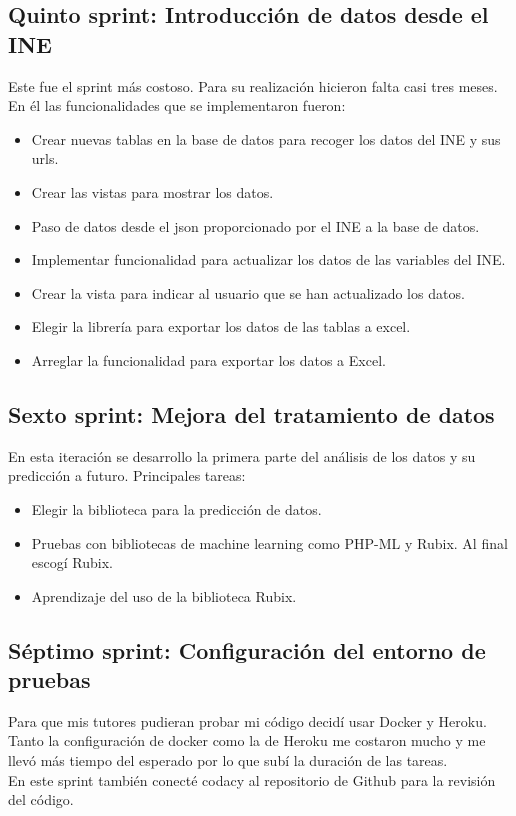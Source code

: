 \subsection{Quinto sprint: Introducción de datos desde el INE}
Este fue el sprint más costoso. Para su realización hicieron falta casi tres meses. En él las funcionalidades que se implementaron fueron:
\begin{itemize}
    \item Crear nuevas tablas en la base de datos para recoger los datos del INE y sus urls.
    \item Crear las vistas para mostrar los datos.
    \item Paso de datos desde el json proporcionado por el INE a la base de datos.
    \item Implementar funcionalidad para actualizar los datos de las variables del INE.  
    \item Crear la vista para indicar al usuario que se han actualizado los datos.
    \item Elegir la librería para exportar los datos de las tablas a excel.
    \item Arreglar la funcionalidad para exportar los datos a Excel.
\end{itemize}
\subsection{Sexto sprint: Mejora del tratamiento de datos}
En esta iteración se desarrollo la primera parte del análisis de los datos y su predicción a futuro.
Principales tareas:
\begin{itemize}
    \item Elegir la biblioteca para la predicción de datos.
    \item Pruebas con bibliotecas de machine learning como PHP-ML y Rubix. Al final escogí Rubix.
    \item Aprendizaje del uso de la biblioteca Rubix.
\end{itemize}
\subsection{Séptimo sprint: Configuración del entorno de pruebas}
Para que mis tutores pudieran probar mi código decidí usar Docker y Heroku.\\
Tanto la configuración de docker como la de Heroku me costaron mucho y me llevó más tiempo del esperado por lo que subí la duración de las tareas.\\
En este sprint también conecté codacy al repositorio de Github para la revisión del código.
